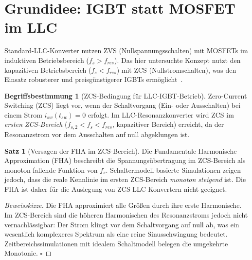 ﻿\documentclass[a4paper,12pt,openany,oneside]{book}
\newcommand{\abschnitt}[1]{\section{#1}}
\theoremstyle{definition}
\newtheorem{definition}{Begriffsbestimmung}[chapter]
\newtheorem{satz}{Satz}[chapter]
\begin{document}
\abschnitt{Grundidee: IGBT statt MOSFET im LLC}

Standard-LLC-Konverter nutzen ZVS (Nullspannungsschalten) mit MOSFETs im induktiven
Betriebsbereich ($f_s > f_{res}$). Das hier untersuchte Konzept nutzt den kapazitiven
Betriebsbereich ($f_s < f_{res}$) mit ZCS (Nullstromschalten), was den Einsatz
robusterer und preisg\"unstigerer IGBTs erm\"oglicht~\cite{Urbaneck2022}.

\begin{definition}[ZCS-Bedingung f\"ur LLC-IGBT-Betrieb]
  Zero-Current Switching (ZCS) liegt vor, wenn der Schalt\-vorgang (Ein- oder Ausschalten)
  bei einem Strom $i_{sw}(t_{sw}) = 0$ erfolgt. Im LLC-Resonanzkonverter wird ZCS
  im \emph{ersten ZCS-Bereich} ($f_{s,2} < f_s < f_{res}$, kapazitiver Bereich) erreicht,
  da der Resonanzstrom vor dem Ausschalten auf null abgeklungen ist.
\end{definition}

\begin{satz}[Versagen der FHA im ZCS-Bereich]
  Die Fundamentale Harmonische Approximation (FHA) beschreibt die Spannungs\"ubertragung
  im ZCS-Bereich als monoton fallende Funktion von $f_s$. Schaltermodell-basierte Simulationen
  zeigen jedoch, dass die reale Kennlinie im ersten ZCS-Bereich \emph{monoton steigend} ist.
  Die FHA ist daher f\"ur die Auslegung von ZCS-LLC-Konvertern nicht geeignet.
\end{satz}

\begin{proof}[Beweisskizze]
  Die FHA approximiert alle Gr\"o\ss{}en durch ihre erste Harmonische. Im ZCS-Bereich
  sind die h\"oheren Harmonischen des Resonanzstroms jedoch nicht vernachl\"assigbar:
  Der Strom klingt vor dem Schaltvorgang auf null ab, was ein wesentlich komplexeres
  Spektrum als eine reine Sinusschwingung bedeutet. Zeitbereichssimulationen mit
  idealem Schaltmodell belegen die umgekehrte Monotonie. \qquad$\square$
\end{proof}
\end{document}
